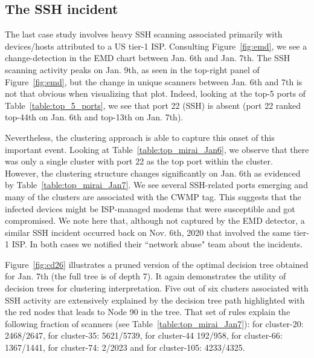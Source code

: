 \documentclass[manuscript, nonacm]{acmart}
\begin{document}

\subsection{The SSH incident}

The last case study involves heavy SSH scanning associated primarily with devices/hosts
attributed to a US tier-1 ISP. Consulting Figure~\ref{fig:emd}, we see
a change-detection in the EMD chart between Jan. 6th and Jan. 7th. 
The SSH scanning activity peaks on Jan. 9th, as seen in the top-right panel
of Figure~\ref{fig:emd}, but the change in unique scanners between Jan. 6th and 7th
is not that obvious when visualizing that plot. Indeed, looking at the top-5
ports of Table~\ref{table:top_5_ports}, we see that port 22 (SSH) is 
absent (port 22 ranked top-44th on Jan. 6th and top-13th on Jan. 7th).

Nevertheless, the clustering approach is able to capture this onset of this
important event. Looking at Table~\ref{table:top_mirai_Jan6},
we observe that there was only a single cluster with port 22 as the
top port within the cluster. However, the clustering
structure changes significantly on Jan. 6th as evidenced by Table~\ref{table:top_mirai_Jan7}.
We see several SSH-related ports emerging and many of the clusters are associated with the CWMP
tag. This suggests that the infected devices might be ISP-managed modems that 
were susceptible and got compromised. 
We note here that, although not captured by the EMD detector,
a similar SSH incident occurred back on Nov. 6th, 2020 that involved the same tier-1 ISP.
In both cases we notified their ``network abuse" team about the incidents. 

Figure~\ref{fig:cd26} illustrates a pruned version of the optimal decision tree
obtained for Jan. 7th (the full tree is of depth 7). It again demonstrates the utility
of decision trees for clustering interpretation. 
Five out of six clusters associated with SSH activity are extensively explained by the decision tree path highlighted
with the red nodes that leads to Node 90 in the tree. 
That set of rules explain the following fraction of scanners (see
Table~\ref{table:top_mirai_Jan7}): for cluster-20: 2468/2647, for cluster-35: 5621/5739, 
for cluster-44 192/958, for cluster-66: 1367/1441, for cluster-74: 2/2023 and for cluster-105: 4233/4325.  
\end{document}
